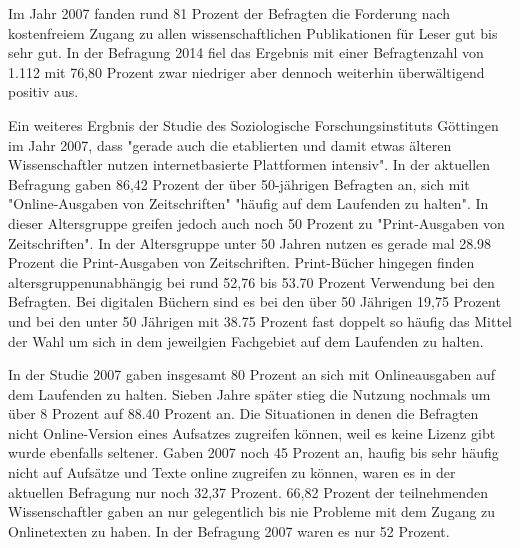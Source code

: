 Im Jahr 2007 fanden rund 81 Prozent der Befragten die Forderung nach kostenfreiem Zugang zu allen wissenschaftlichen Publikationen für Leser gut bis sehr gut. In der Befragung 2014 fiel das Ergebnis mit einer Befragtenzahl von 1.112 mit 76,80 Prozent zwar niedriger aber dennoch weiterhin überwältigend positiv aus.

Ein weiteres Ergbnis der Studie des Soziologische Forschungsinstituts Göttingen im Jahr 2007, dass "gerade auch die etablierten und damit etwas älteren Wissenschaftler nutzen internetbasierte Plattformen intensiv". In der aktuellen Befragung gaben 86,42 Prozent der über 50-jährigen Befragten an, sich mit "Online-Ausgaben von Zeitschriften" "häufig auf dem Laufenden zu halten". In dieser Altersgruppe greifen jedoch auch noch 50 Prozent zu "Print-Ausgaben von Zeitschriften". In der Altersgruppe unter 50 Jahren nutzen es gerade mal 28.98 Prozent die Print-Ausgaben von Zeitschriften. Print-Bücher hingegen finden altersgruppenunabhängig bei rund 52,76 bis 53.70 Prozent Verwendung bei den Befragten. Bei digitalen Büchern sind es bei den über 50 Jährigen 19,75 Prozent und bei den unter 50 Jährigen mit 38.75 Prozent fast doppelt so häufig das Mittel der Wahl um sich in dem jeweilgien Fachgebiet auf dem Laufenden zu halten.

In der Studie 2007 gaben insgesamt 80 Prozent an sich mit Onlineausgaben auf dem Laufenden zu halten. Sieben Jahre später stieg die Nutzung nochmals um über 8 Prozent auf 88.40 Prozent an. Die Situationen in denen die Befragten nicht Online-Version eines Aufsatzes zugreifen können, weil es keine Lizenz gibt wurde ebenfalls seltener. Gaben 2007 noch 45 Prozent an, haufig bis sehr häufig nicht auf Aufsätze und Texte online zugreifen zu können, waren es in der aktuellen Befragung nur noch 32,37 Prozent. 66,82 Prozent der teilnehmenden Wissenschaftler gaben an nur gelegentlich bis nie Probleme mit dem Zugang zu Onlinetexten zu haben. In der Befragung 2007 waren es nur 52 Prozent.

